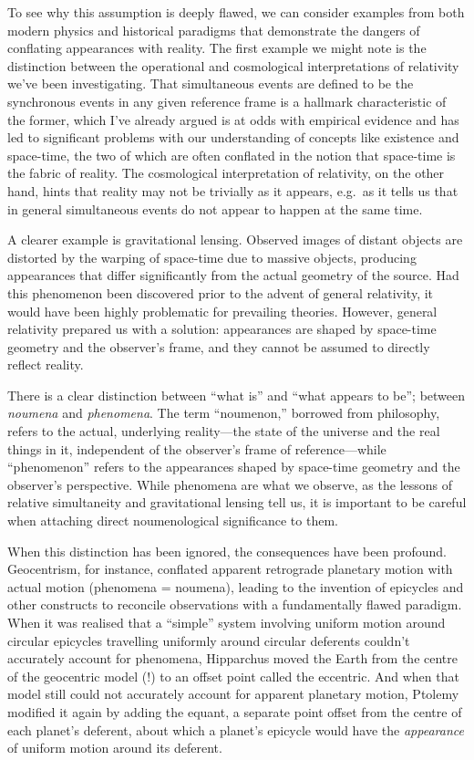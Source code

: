 \documentclass[aps,rmp,groupedaddress,twocolumn,10pt]{revtex4-2}
\begin{document}
To see why this assumption is deeply flawed, we can consider examples from both modern physics and historical paradigms that demonstrate the dangers of conflating appearances with reality. The first example we might note is the distinction between the operational and cosmological interpretations of relativity we've been investigating. That simultaneous events are defined to be the synchronous events in any given reference frame is a hallmark characteristic of the former, which I've already argued is at odds with empirical evidence and has led to significant problems with our understanding of concepts like existence and space-time, the two of which are often conflated in the notion that space-time is the fabric of reality. The cosmological interpretation of relativity, on the other hand, hints that reality may not be trivially as it appears, e.g.\ as it tells us that in general simultaneous events do not appear to happen at the same time. 

A clearer example is gravitational lensing. Observed images of distant objects are distorted by the warping of space-time due to massive objects, producing appearances that differ significantly from the actual geometry of the source. Had this phenomenon been discovered prior to the advent of general relativity, it would have been highly problematic for prevailing theories. However, general relativity prepared us with a solution: appearances are shaped by space-time geometry and the observer's frame, and they cannot be assumed to directly reflect reality.

There is a clear distinction between ``what is'' and ``what appears to be''; between \textit{noumena} and \textit{phenomena}. The term ``noumenon,'' borrowed from philosophy, refers to the actual, underlying reality---the state of the universe and the real things in it, independent of the observer's frame of reference---while ``phenomenon'' refers to the appearances shaped by space-time geometry and the observer's perspective. While phenomena are what we observe, as the lessons of relative simultaneity and gravitational lensing tell us, it is important to be careful when attaching direct noumenological significance to them.

When this distinction has been ignored, the consequences have been profound. Geocentrism, for instance, conflated apparent retrograde planetary motion with actual motion (phenomena = noumena), leading to the invention of epicycles and other constructs to reconcile observations with a fundamentally flawed paradigm. When it was realised that a ``simple'' system involving uniform motion around circular epicycles travelling uniformly around circular deferents couldn't accurately account for phenomena, Hipparchus moved the Earth from the centre of the geocentric model (!) to an offset point called the eccentric. And when that model still could not accurately account for apparent planetary motion, Ptolemy modified it again by adding the equant, a separate point offset from the centre of each planet's deferent, about which a planet's epicycle would have the \textit{appearance} of uniform motion around its deferent.
\end{document}
